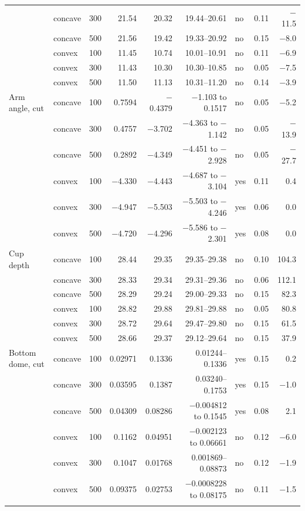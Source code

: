 \documentclass[pdflatex,sn-basic]{sn-jnl}
\begin{document}
\begin{table}[p]
\begin{tabular}{@{}llrrrrlrr@{}}
 & concave & 300 & 21.54 & 20.32 & 19.44--20.61 & no & 0.11 & $-$11.5 \\
 & concave & 500 & 21.56 & 19.42 & 19.33--20.92 & no & 0.15 & $-$8.0 \\
 & convex & 100 & 11.45 & 10.74 & 10.01--10.91 & no & 0.11 & $-$6.9 \\
 & convex & 300 & 11.43 & 10.30 & 10.30--10.85 & no & 0.05 & $-$7.5 \\
 & convex & 500 & 11.50 & 11.13 & 10.31--11.20 & no & 0.14 & $-$3.9 \\
Arm angle, cut & concave & 100 & 0.7594 & $-$0.4379 & $-$1.103 to 0.1517 & no & 0.05 & $-$5.2 \\
 & concave & 300 & 0.4757 & $-$3.702 & $-$4.363 to $-$1.142 & no & 0.05 & $-$13.9 \\
 & concave & 500 & 0.2892 & $-$4.349 & $-$4.451 to $-$2.928 & no & 0.05 & $-$27.7 \\
 & convex & 100 & $-$4.330 & $-$4.443 & $-$4.687 to $-$3.104 & yes & 0.11 & 0.4 \\
 & convex & 300 & $-$4.947 & $-$5.503 & $-$5.503 to $-$4.246 & yes & 0.06 & 0.0 \\
 & convex & 500 & $-$4.720 & $-$4.296 & $-$5.586 to $-$2.301 & yes & 0.08 & 0.0 \\
Cup depth & concave & 100 & 28.44 & 29.35 & 29.35--29.38 & no & 0.10 & 104.3 \\
 & concave & 300 & 28.33 & 29.34 & 29.31--29.36 & no & 0.06 & 112.1 \\
 & concave & 500 & 28.29 & 29.24 & 29.00--29.33 & no & 0.15 & 82.3 \\
 & convex & 100 & 28.82 & 29.88 & 29.81--29.88 & no & 0.05 & 80.8 \\
 & convex & 300 & 28.72 & 29.64 & 29.47--29.80 & no & 0.15 & 61.5 \\
 & convex & 500 & 28.66 & 29.37 & 29.12--29.64 & no & 0.15 & 37.9 \\
Bottom dome, cut & concave & 100 & 0.02971 & 0.1336 & 0.01244--0.1336 & yes & 0.15 & 0.2 \\
 & concave & 300 & 0.03595 & 0.1387 & 0.03240--0.1753 & yes & 0.15 & $-$1.0 \\
 & concave & 500 & 0.04309 & 0.08286 & $-$0.004812 to 0.1545 & yes & 0.08 & 2.1 \\
 & convex & 100 & 0.1162 & 0.04951 & $-$0.002123 to 0.06661 & no & 0.12 & $-$6.0 \\
 & convex & 300 & 0.1047 & 0.01768 & 0.001869--0.08873 & no & 0.12 & $-$1.9 \\
 & convex & 500 & 0.09375 & 0.02753 & $-$0.0008228 to 0.08175 & no & 0.11 & $-$1.5 \\
\botrule
\end{tabular}
\end{table}
\end{document}
